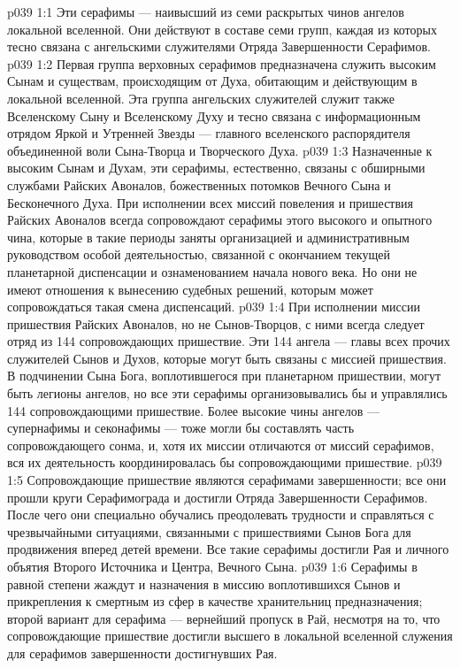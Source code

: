 \vs p039 1:1 Эти серафимы --- наивысший из семи раскрытых чинов ангелов локальной вселенной. Они действуют в составе семи групп, каждая из которых тесно связана с ангельскими служителями Отряда Завершенности Серафимов.
\vs p039 1:2 \bibnobreakspace {} Первая группа верховных серафимов предназначена служить высоким Сынам и существам, происходящим от Духа, обитающим и действующим в локальной вселенной. Эта группа ангельских служителей служит также Вселенскому Сыну и Вселенскому Духу и тесно связана с информационным отрядом Яркой и Утренней Звезды --- главного вселенского распорядителя объединенной воли Сына\hyp{}Творца и Творческого Духа.
\vs p039 1:3 Назначенные к высоким Сынам и Духам, эти серафимы, естественно, связаны с обширными службами Райских Авоналов, божественных потомков Вечного Сына и Бесконечного Духа. При исполнении всех миссий повеления и пришествия Райских Авоналов всегда сопровождают серафимы этого высокого и опытного чина, которые в такие периоды заняты организацией и административным руководством особой деятельностью, связанной с окончанием текущей планетарной диспенсации и ознаменованием начала нового века. Но они не имеют отношения к вынесению судебных решений, которым может сопровождаться такая смена диспенсаций.
\vs p039 1:4 \pc {} При исполнении миссии пришествия Райских Авоналов, но не Сынов\hyp{}Творцов, с ними всегда следует отряд из 144 сопровождающих пришествие. Эти 144 ангела --- главы всех прочих служителей Сынов и Духов, которые могут быть связаны с миссией пришествия. В подчинении Сына Бога, воплотившегося при планетарном пришествии, могут быть легионы ангелов, но все эти серафимы организовывались бы и управлялись 144 сопровождающими пришествие. Более высокие чины ангелов --- супернафимы и секонафимы --- тоже могли бы составлять часть сопровождающего сонма, и, хотя их миссии отличаются от миссий серафимов, вся их деятельность координировалась бы сопровождающими пришествие.
\vs p039 1:5 Сопровождающие пришествие являются серафимами завершенности; все они прошли круги Серафимограда и достигли Отряда Завершенности Серафимов. После чего они специально обучались преодолевать трудности и справляться с чрезвычайными ситуациями, связанными с пришествиями Сынов Бога для продвижения вперед детей времени. Все такие серафимы достигли Рая и личного объятия Второго Источника и Центра, Вечного Сына.
\vs p039 1:6 Серафимы в равной степени жаждут и назначения в миссию воплотившихся Сынов и прикрепления к смертным из сфер в качестве хранительниц предназначения; второй вариант для серафима --- вернейший пропуск в Рай, несмотря на то, что сопровождающие пришествие достигли высшего в локальной вселенной служения для серафимов завершенности достигнувших Рая.
